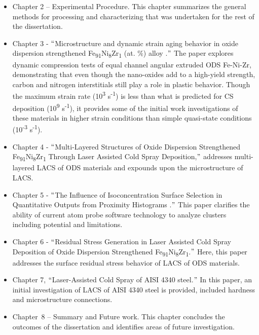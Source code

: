 	
	\begin{itemize}
		\item Chapter 2 – Experimental Procedure. This chapter summarizes the general methods for processing and characterizing that was undertaken for the rest of the dissertation. \par
	
		\item Chapter 3 - $``$Microstructure and dynamic strain aging behavior in oxide dispersion strengthened Fe\textsubscript{91}Ni\textsubscript{8}Zr\textsubscript{1 }(at. $\%$)  alloy \cite{RN267}.$"$  The paper explores dynamic compression tests of equal channel angular extruded ODS Fe-Ni-Zr, demonstrating that even though the nano-oxides add to a high-yield strength, carbon and nitrogen interstitials still play a role in plastic behavior. Though the maximum strain rate (10\textsuperscript{3} s\textsuperscript{-1}) is less than what is predicted for CS deposition (10\textsuperscript{9} s\textsuperscript{-1}), it provides some of the initial work investigations of these materials in higher strain conditions than simple quasi-state conditions (10\textsuperscript{-3} s\textsuperscript{-1}). \par
	
		\item Chapter 4 - $``$Multi-Layered Structures of Oxide Dispersion Strengthened Fe\textsubscript{91}Ni\textsubscript{8}Zr\textsubscript{1} Through Laser Assisted Cold Spray Deposition,$"$  addresses multi-layered LACS of ODS materials and expounds upon the microstructure of LACS. \par
	
		\item Chapter 5 - $``$The Influence of Isoconcentration Surface Selection in Quantitative Outputs from Proximity Histograms \cite{RN1023}.$"$  This paper clarifies the ability of current atom probe software technology to analyze clusters including potential and limitations. \par
	
		\item Chapter 6 - $``$Residual Stress Generation in Laser Assisted Cold Spray Deposition of Oxide Dispersion Strengthened Fe\textsubscript{91}Ni\textsubscript{8}Zr\textsubscript{1}.$"$  Here, this paper addresses the surface residual stress behavior of LACS of ODS materials. \par
	
		\item Chapter 7, $``$Laser-Assisted Cold Spray of AISI 4340 steel.$"$  In this paper, an initial investigation of LACS of AISI 4340 steel is provided, included hardness and microstructure connections. \par
	
		\item Chapter\ 8 – Summary and Future work.  This chapter concludes the outcomes of the dissertation and identifies areas of future investigation.
	\end{itemize}

